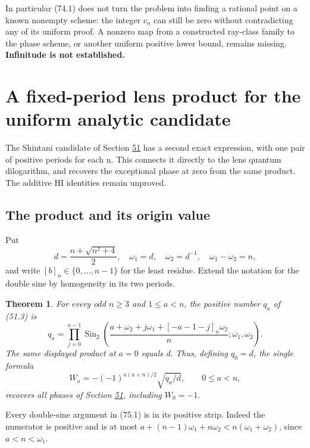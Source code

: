 \documentclass[11pt,reqno]{amsart}
\theoremstyle{plain}
\newtheorem{theorem}{Theorem}[section]
\begin{document}
In particular (74.1) does not turn the problem into finding a rational
point on a known nonempty scheme: the integer \(c_n\) can still be zero
without contradicting any of its uniform proof. A nonzero map from a
constructed ray-class family to the phase scheme, or another uniform
positive lower bound, remains missing. \textbf{Infinitude is not established.}

\section{A fixed-period lens product for the uniform analytic candidate}\label{sec:75}

The Shintani candidate of Section \hyperref[sec:51]{51} has a second exact expression, with
one pair of positive periods for each n. This connects it directly to
the lens quantum dilogarithm, and recovers the exceptional phase at zero
from the same product. The additive HI identities remain unproved.

\subsection{The product and its origin value}\label{sec:75.1}

Put
\[
 d=\frac{n+\sqrt{n^2+4}}2,\quad
 \omega_1=d,\quad\omega_2=d^{-1},\quad
 \omega_1-\omega_2=n,
\]
and write \([b]_n\in\{0,\ldots,n-1\}\) for the least residue. Extend
the notation for the double sine by homogeneity in its two periods.

\begin{theorem}
For every odd \(n\ge3\) and \(1\le a<n\), the positive
number \(q_a\) of (51.3) is
\begin{equation*}
 \boxed{\displaystyle
 q_a=\prod_{j=0}^{n-1}
 \operatorname{Sin}_2\!\left(
 \frac{a+\omega_2+j\omega_1+[-a-1-j]_n\omega_2}{n};
 \omega_1,\omega_2\right).}
 \tag{75.1}
\end{equation*}
The same displayed product at \(a=0\) equals d. Thus, defining
\(q_0=d\), the single formula
\begin{equation*}
 W_a=-(-1)^{a(a+n)/2}\sqrt{q_a/d},\qquad 0\le a<n,
 \tag{75.2}
\end{equation*}
recovers all phases of Section \hyperref[sec:51]{51}, including \(W_0=-1\).
\end{theorem}

Every double-sine argument in (75.1) is in its positive strip. Indeed
the numerator is positive and is at most
\(a+(n-1)\omega_1+n\omega_2<n(\omega_1+\omega_2)\), since
\(a<n<\omega_1\).
\end{document}
